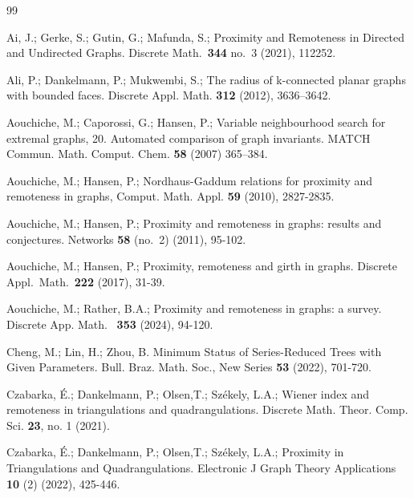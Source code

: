 \documentclass[a4paper,11pt]{article}
\begin{document}
\begin{thebibliography}{99}

 Ai, J.; Gerke, S.; Gutin, G.; Mafunda, S.; 
     Proximity and Remoteness in Directed and Undirected Graphs. 
     Discrete Math.\ {\bf 344} no.\ 3 (2021), 112252. 
     
 Ali, P.; Dankelmann, P.; Mukwembi, S.; 
     The radius of k-connected planar graphs with bounded faces. 
     Discrete Appl. Math. {\bf 312} (2012), 3636–3642.
     
     
 Aouchiche, M.; Caporossi, G.; Hansen, P.;
     Variable neighbourhood search for extremal graphs, 20. Automated comparison of graph invariants. 
     MATCH Commun. Math. Comput. Chem. {\bf 58} (2007) 365–384.
     
 Aouchiche, M.; Hansen, P.;
     Nordhaus-Gaddum relations for proximity and remoteness in graphs, 
     Comput. Math. Appl. {\bf 59} (2010), 2827-2835.
     
 Aouchiche, M.; Hansen, P.;
     Proximity and remoteness in graphs: results and conjectures.
     Networks {\bf 58} (no.\ 2) (2011), 95-102.
     
 Aouchiche, M.; Hansen, P.;
    Proximity, remoteness and girth in graphs. 
    Discrete Appl.\ Math.\ {\bf 222} (2017), 31-39. 
         
 Aouchiche, M.; Rather, B.A.;  
     Proximity and remoteness in graphs: a survey. 
     Discrete App. Math. \ {\bf 353} (2024), 94-120.
     
  Cheng, M.; Lin, H.; Zhou, B.
     Minimum Status of Series-Reduced Trees with Given Parameters. 
     Bull. Braz. Math. Soc., New Series {\bf 53} (2022), 701-720.
         
 Czabarka, \'{E}.; Dankelmann, P.; Olsen,T.; Sz\'{e}kely, L.A.;  
     Wiener index and remoteness in triangulations and quadrangulations. 
     Discrete Math. Theor. Comp. Sci. {\bf 23}, no. 1 (2021). 
     
 Czabarka, \'{E}.; Dankelmann, P.; Olsen,T.; Sz\'{e}kely, L.A.;  
     Proximity in Triangulations and Quadrangulations. 
     Electronic J Graph Theory Applications {\bf 10} (2) (2022), 425-446.
   

\end{thebibliography}
\end{document}
